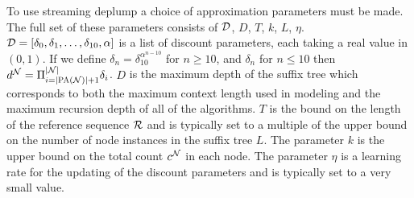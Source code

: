 To use streaming deplump a choice of approximation  parameters must be made.  The full set of these parameters consists of $\D$, $D$, $T$, $k$, $L$, $\eta$.  $\D = [\dd_0, \dd_1, \ldots, \dd_{10}, \alpha]$ is a list of discount parameters, each taking a real value in $(0,1)$.  If we define $\delta_{n} = \delta_{10}^{\alpha^{n - 10}}$ for $n \geq 10$, and $\delta_n$ for $n \leq 10$ then $d^{\N} = \Pi_{i =|\textsc{PA}(\N)| + 1}^{|\N|} \delta_{i}$.  $D$ is the maximum depth of the suffix tree which corresponds to both the maximum context length used in modeling and the maximum recursion depth of all of the algorithms.  $T$ is the bound on the length of the reference sequence $\RS$ and is typically set to a multiple of the upper bound on the number of node instances in the suffix tree $L$.  The parameter $k$ is the upper bound on the total count $c^\N$ in each node.  The parameter $\eta$ is a learning rate for the updating of the discount parameters and is typically set to a very small value.  






%
%
%				
%
